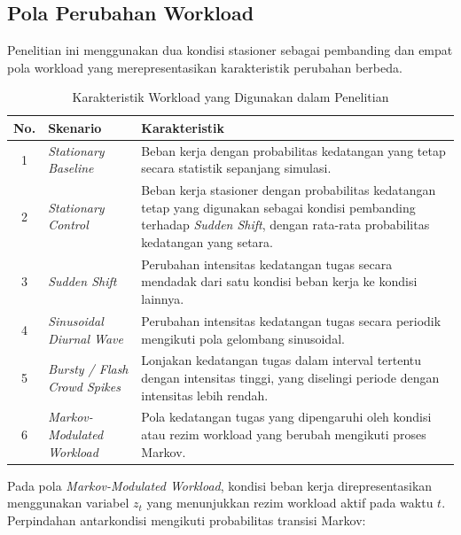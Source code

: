 \vspace{1cm}
\subsection{Pola Perubahan Workload}
\label{subsec:pola_perubahan_workload}

Penelitian ini menggunakan dua kondisi stasioner sebagai pembanding dan empat pola workload yang merepresentasikan karakteristik perubahan berbeda.


\begin{table}[H]
\centering
\caption{Karakteristik Workload yang Digunakan dalam Penelitian}
\label{tab:pola_perubahan_workload}
\renewcommand{\arraystretch}{1.3}
\begin{tabularx}{\textwidth}{c l X}
\toprule
\textbf{No.} & \textbf{Skenario} & \textbf{Karakteristik} \\
\midrule
1 & \textit{Stationary Baseline}
  & Beban kerja dengan probabilitas kedatangan yang tetap secara statistik sepanjang simulasi. \\

2 & \textit{Stationary Control}
  & Beban kerja stasioner dengan probabilitas kedatangan tetap yang digunakan sebagai kondisi pembanding terhadap \textit{Sudden Shift}, dengan rata-rata probabilitas kedatangan yang setara. \\

3 & \textit{Sudden Shift}
  & Perubahan intensitas kedatangan tugas secara mendadak dari satu kondisi beban kerja ke kondisi lainnya. \\

4 & \textit{Sinusoidal Diurnal Wave}
  & Perubahan intensitas kedatangan tugas secara periodik mengikuti pola gelombang sinusoidal. \\

5 & \textit{Bursty / Flash Crowd Spikes}
  & Lonjakan kedatangan tugas dalam interval tertentu dengan intensitas tinggi, yang diselingi periode dengan intensitas lebih rendah. \\

6 & \textit{Markov-Modulated Workload}
  & Pola kedatangan tugas yang dipengaruhi oleh kondisi atau rezim workload yang berubah mengikuti proses Markov. \\
\bottomrule
\end{tabularx}
\end{table}

Pada pola \textit{Markov-Modulated Workload}, kondisi beban kerja direpresentasikan menggunakan variabel $z_t$ yang menunjukkan rezim workload aktif pada waktu $t$. Perpindahan antarkondisi mengikuti probabilitas transisi Markov:

